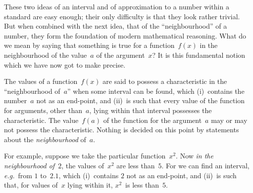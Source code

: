 \documentclass[12pt,leqno]{book}[2005/09/16]
\newcommand{\PageSep}[1]{\ignorespaces}
\newcommand{\eg}{\emph{e.g.}}
\begin{document}
These two ideas of an interval and of
%
approximation to a number within a standard
are easy enough; their only difficulty is that
they look rather trivial. But when combined
with the next idea, that of the ``neighbourhood''
of a number, they form the foundation
of modern mathematical reasoning. What
do we mean by saying that something is true
for a function~$f(x)$ in the neighbourhood of
the value~$a$ of the argument~$x$? It is this
fundamental notion which we have now got to
make precise.

The values of a function~$f(x)$ are said to
possess a characteristic in the ``neighbourhood
of~$a$'' when some interval can be found,
which (i)~contains the number~$a$ not as an
end-point, and (ii)~is such that every value
\PageSep{160}
of the function for arguments, other than~$a$,
lying within that interval possesses the characteristic.
The value~$f(a)$ of the function for
the argument~$a$ may or may not possess the
characteristic. Nothing is decided on this
point by statements about the \emph{neighbourhood}
of~$a$.

For example, suppose we take the particular
function~$x^{2}$. Now \emph{in the neighbourhood of~$2$},
the values of~$x^{2}$ are less than~$5$. For we can
find an interval, \eg\ from $1$ to~$2.1$, which
(i)~contains $2$ not as an end-point, and (ii)~is
such that, for values of~$x$ lying within it, $x^{2}$~is
less than~$5$.
\end{document}

